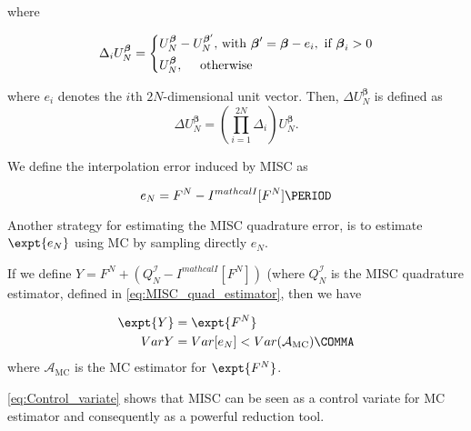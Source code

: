 where 

\begin{equation}
\Delta_i U_N^{\boldsymbol{\beta}} = \left\{ 
\aligned 
 U_N^{\boldsymbol{\beta}} &- U_N^{\boldsymbol{\beta}'}  \text{, with } \boldsymbol{\beta}' =\boldsymbol{\beta} - e_i, \text{ if } \boldsymbol{\beta}_i>0 \\
 U_N^{\boldsymbol{\beta}} &, \quad  \text{ otherwise}
\endaligned
\right.
\end{equation}


where $e_i$ denotes the $i$th $2N$-dimensional unit vector. Then, $\Delta
U_N^{\boldsymbol{\beta}}$ is defined as
\begin{equation}
\Delta U_N^{\boldsymbol{\beta}} = \left( \prod_{i=1}^{2N} \Delta_i \right) U_N^{\boldsymbol{\beta}}.
\end{equation}

We define the interpolation error induced by MISC as

\begin{equation}
e_{N}= F^N-I^{mathcal{I}}[F^N] \PERIOD
\end{equation}



Another strategy for estimating the MISC quadrature error, is to estimate $\expt{e_N}$ using MC by sampling directly $e_N$.

If we define $Y=F^N+(Q_N^{\mathcal{I}}-I^{mathcal{I}}[F^N])$ (where $Q_N^{\mathcal{I}}$ is the MISC quadrature estimator, defined in \eqref{eq:MISC_quad_estimator}, then we have

\begin{align}\label{eq:Control_variate}
\expt{Y}&=\expt{F^N}\nonumber\\
Var{Y}&=Var[e_N]< Var(\mathcal{A}_{\text{MC}})\COMMA
\end{align}
where $\mathcal{A}_{\text{MC}}$ is the MC estimator for $\expt{F^N}$.

\eqref{eq:Control_variate} shows that MISC can be seen as a control variate for MC estimator and consequently as a powerful reduction tool.


